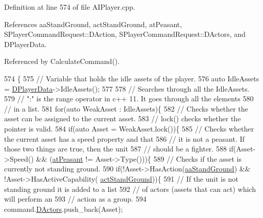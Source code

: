 Definition at line 574 of file A\+I\+Player.\+cpp.



References aa\+Stand\+Ground, act\+Stand\+Ground, at\+Peasant, S\+Player\+Command\+Request\+::\+D\+Action, S\+Player\+Command\+Request\+::\+D\+Actors, and D\+Player\+Data.



Referenced by Calculate\+Command().


\begin{DoxyCode}
574                                                               \{
575     \textcolor{comment}{// Variable that holds the idle assets of the player.}
576     \textcolor{keyword}{auto} IdleAssets = \hyperlink{classCAIPlayer_a83b5113c8f7e80df54940b647c5ee2e6}{DPlayerData}->IdleAssets();
577     
578     \textcolor{comment}{// Searches through all the IdleAssets.}
579     \textcolor{comment}{// ":" is the range operator in c++ 11. It goes through all the elements}
580     \textcolor{comment}{// in a list.}
581     \textcolor{keywordflow}{for}(\textcolor{keyword}{auto} WeakAsset : IdleAssets)\{
582         \textcolor{comment}{// Checks whether the asset can be assigned to the current asset.}
583         \textcolor{comment}{// lock() checks whether the pointer is valid.}
584         \textcolor{keywordflow}{if}(\textcolor{keyword}{auto} Asset = WeakAsset.lock())\{
585             \textcolor{comment}{// Checks whether the current asset has a speed property and that}
586             \textcolor{comment}{// it is not a peasant. If those two things are true, then the unit}
587             \textcolor{comment}{// should be a fighter.}
588             \textcolor{keywordflow}{if}(Asset->Speed() && (\hyperlink{GameDataTypes_8h_a5600d4fc433b83300308921974477fecaf5e570c7e5a2266810f610e7f945ea61}{atPeasant} != Asset->Type()))\{
589                 \textcolor{comment}{// Checks if the asset is currently not standing ground.}
590                 \textcolor{keywordflow}{if}(!Asset->HasAction(\hyperlink{GameDataTypes_8h_ab47668e651a3032cfb9c40ea2d60d670abd8a4e07a8f888148ed62ddd46719af3}{aaStandGround}) && !Asset->HasActiveCapability(
      \hyperlink{GameDataTypes_8h_a35b98ce26aca678b03c6f9f76e4778cea60ecb1b155c04190174a46d8053b5a04}{actStandGround}))\{
591                     \textcolor{comment}{// If the unit is not standing ground it is added to a list}
592                     \textcolor{comment}{// of actors (assets that can act) which will perform an}
593                     \textcolor{comment}{// action as a group.}
594                     command.\hyperlink{structSPlayerCommandRequest_aa37fc01519676345703d78b9f573894a}{DActors}.push\_back(Asset);

\end{DoxyCode}
